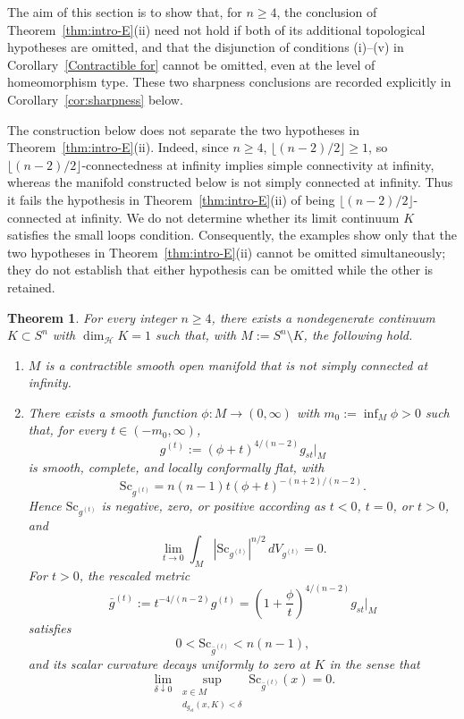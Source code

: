 \documentclass[12pt,oneside,a4paper]{article}
\theoremstyle{mytheorem}
\newtheorem{theorem}[definition]{Theorem}
\theoremstyle{remark}
\theoremstyle{definition}
\begin{document}
The aim of this section is to show that, for $n\geq4$, the conclusion of
Theorem~\ref{thm:intro-E}(ii) need not hold if both of its additional topological
hypotheses are omitted, and that the disjunction of conditions
\textup{(i)}--\textup{(v)}
in Corollary~\ref{Contractible for} cannot be omitted, even at the level of
homeomorphism type.  These two sharpness conclusions are recorded explicitly
in Corollary~\ref{cor:sharpness} below.

The construction below does not separate the two hypotheses in
Theorem~\ref{thm:intro-E}(ii).  Indeed, since $n\geq4$,
$\lfloor(n-2)/2\rfloor\geq1$, so
$\lfloor(n-2)/2\rfloor$-connectedness at infinity implies simple
connectivity at infinity, whereas the manifold constructed below is not
simply connected at infinity.  Thus it fails the hypothesis in
Theorem~\ref{thm:intro-E}(ii) of being $\lfloor(n-2)/2\rfloor$-connected at infinity.
We do not determine whether its limit continuum $K$ satisfies the small
loops condition.  Consequently, the examples show only that the two
hypotheses in Theorem~\ref{thm:intro-E}(ii) cannot be omitted simultaneously; they do
not establish that either hypothesis can be omitted while the other is
retained.


\begin{theorem}\label{thm:counterexample-psc}
For every integer $n\geq4$, there exists a nondegenerate continuum
$K\subset S^n$ with $\dim_{\mathcal{H}}K=1$ such that, with
$M:=S^n\setminus K$, the following hold.
\begin{enumerate}
\item $M$ is a contractible smooth open manifold that is not simply connected at infinity.

\item There exists a smooth function $\phi:M\to(0,\infty)$ with
$m_0:=\inf_M\phi>0$ such that, for every $t\in(-m_0,\infty)$,
\[
g^{(t)}:=(\phi+t)^{4/(n-2)}g_{st}|_M
\]
is smooth, complete, and locally conformally flat, with
\[
\mathrm{Sc}_{g^{(t)}}=n(n-1)t(\phi+t)^{-(n+2)/(n-2)}.
\]
Hence $\mathrm{Sc}_{g^{(t)}}$ is negative, zero, or positive according as
$t<0$, $t=0$, or $t>0$, and
\[
\lim_{t\to0}\int_M|\mathrm{Sc}_{g^{(t)}}|^{n/2}\,dV_{g^{(t)}}=0.
\]
For $t>0$, the rescaled metric
\[
\bar g^{(t)}
:=t^{-4/(n-2)}g^{(t)}
=\left(1+\frac{\phi}{t}\right)^{4/(n-2)}g_{st}|_M
\]
satisfies
\[
0<\mathrm{Sc}_{\bar g^{(t)}}<n(n-1),
\]
and its scalar curvature decays uniformly to zero at $K$ in the sense
that
\[
 \lim_{\delta\downarrow0}
 \sup_{\substack{x\in M\\ d_{g_{st}}(x,K)<\delta}}
 \mathrm{Sc}_{\bar g^{(t)}}(x)=0.
\]
\end{enumerate}
\end{theorem}
\end{document}
